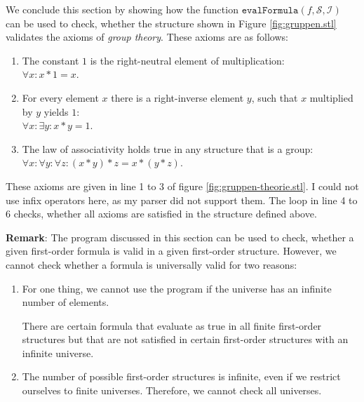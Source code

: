 We conclude this section by showing how the function
$\texttt{evalFormula}(f, \mathcal{S}, \mathcal{I})$ can be used to check, whether the
structure shown in Figure \ref{fig:gruppen.stl} validates the axioms of  \emph{group theory}.
These axioms are as follows:
\begin{enumerate}
\item The constant $1$ is the right-neutral element of multiplication:
      \\[0.2cm]
      \hspace*{1.3cm}
      $\forall x\colon x * 1 = x$.
\item For every element $x$ there is a right-inverse element $y$, such that
      $x$ multiplied by $y$ yields $1$:      
      \\[0.2cm]
      \hspace*{1.3cm}
      $\forall x \colon \exists y \colon x * y = 1$.
\item The law of associativity holds true in any structure that is a group:
      \\[0.2cm]
      \hspace*{1.3cm}
      $\forall x \colon \forall y \colon \forall z \colon (x * y) * z = x * (y * z)$.
\end{enumerate}
These axioms are given in line  1 to 3 of figure \ref{fig:gruppen-theorie.stl}.
I could not use infix operators here, as my parser did not support them.
The loop in line  4 to 6 checks, whether all axioms are satisfied in the structure defined
above.
\vspace*{0.3cm}

\noindent
\textbf{Remark}:  The program discussed in this section can be used to check, whether a
given first-order formula is valid in a given first-order structure.  However, we cannot
check whether a formula is universally valid for two reasons: 
\begin{enumerate}
\item For one thing, we cannot use the program if the universe has an infinite number of
      elements.

      There are certain formula that evaluate as true in all finite first-order structures but
      that are not satisfied in certain first-order structures with an infinite universe.
\item The number of possible first-order structures is infinite, even if we restrict
      ourselves to finite universes. Therefore, we cannot check all universes.
\end{enumerate}

